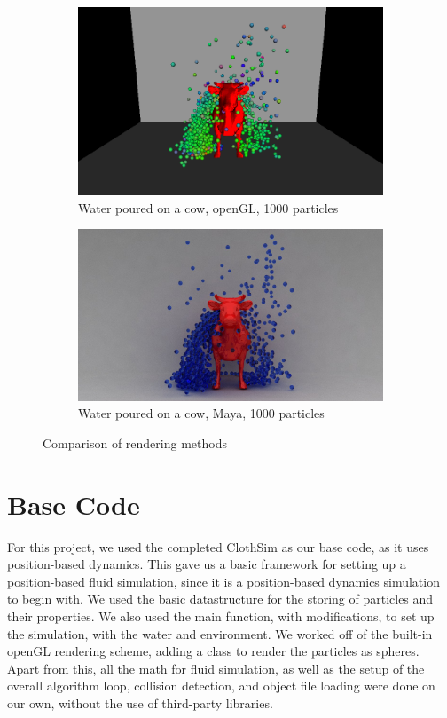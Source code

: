 \documentclass[conference]{IEEEtran}
\begin{document}
\begin{figure}[H]
\centering
\begin{subfigure}{0.475\textwidth}
  \centering
  \includegraphics[width=1.0\linewidth]{WaterSimCow100.png}
  \caption{Water poured on a cow, openGL, 1000 particles}
  \label{fig:opengl_cow}
\end{subfigure}
\begin{subfigure}{0.475\textwidth}
  \centering
  \includegraphics[width=1.0\linewidth]{WaterSimCow100-maya.jpg}
  \caption{Water poured on a cow, Maya, 1000 particles}
  \label{fig:maya_cow}
\end{subfigure}
\caption{Comparison of rendering methods}
\label{fig:render_compare}
\end{figure}
\section{Base Code} 
For this project, we used the completed ClothSim as our base code, as it uses position-based dynamics. This gave us a basic framework for setting up a position-based fluid simulation, since it is a position-based dynamics simulation to begin with. We used the basic datastructure for the storing of particles and their properties. We also used the main function, with modifications, to set up the simulation, with the water and environment. We worked off of the built-in openGL rendering scheme, adding a class to render the particles as spheres. Apart from this, all the math for fluid simulation, as well as the setup of the overall algorithm loop, collision detection, and object file loading were done on our own, without the use of third-party libraries. 
\end{document}

